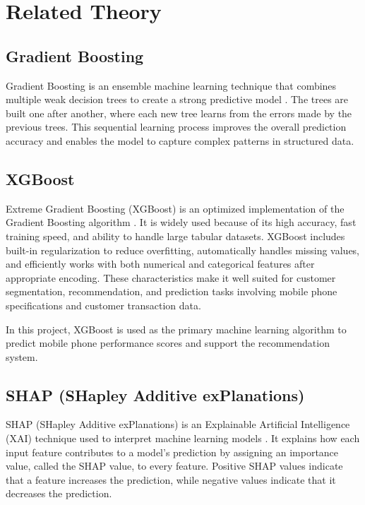 \documentclass[12pt, a4paper]{report}
\numberwithin{figure}{chapter}
\numberwithin{table}{chapter}
\numberwithin{equation}{chapter}
\begin{document}
\section{Related Theory}

\subsection{Gradient Boosting}

Gradient Boosting is an ensemble machine learning technique that combines multiple weak decision trees to create a strong predictive model \cite{friedman}. The trees are built one after another, where each new tree learns from the errors made by the previous trees. This sequential learning process improves the overall prediction accuracy and enables the model to capture complex patterns in structured data.

\subsection{XGBoost}

Extreme Gradient Boosting (XGBoost) is an optimized implementation of the Gradient Boosting algorithm \cite{chen}. It is widely used because of its high accuracy, fast training speed, and ability to handle large tabular datasets. XGBoost includes built-in regularization to reduce overfitting, automatically handles missing values, and efficiently works with both numerical and categorical features after appropriate encoding. These characteristics make it well suited for customer segmentation, recommendation, and prediction tasks involving mobile phone specifications and customer transaction data.

In this project, XGBoost is used as the primary machine learning algorithm to predict mobile phone performance scores and support the recommendation system.

\subsection{SHAP (SHapley Additive exPlanations)}

SHAP (SHapley Additive exPlanations) is an Explainable Artificial Intelligence (XAI) technique used to interpret machine learning models \cite{lundberg}. It explains how each input feature contributes to a model's prediction by assigning an importance value, called the SHAP value, to every feature. Positive SHAP values indicate that a feature increases the prediction, while negative values indicate that it decreases the prediction.
\end{document}
